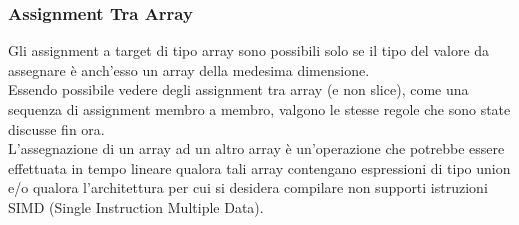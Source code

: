 \subsubsection{Assignment Tra Array}
Gli assignment a target di tipo array sono possibili solo se il tipo del valore da assegnare 
è anch'esso un array della medesima dimensione. \\

Essendo possibile vedere degli assignment tra array (e non slice), come una sequenza 
di assignment membro a membro, valgono le stesse regole che sono state discusse fin ora. \\

L'assegnazione di un array ad un altro array è un'operazione che potrebbe essere effettuata in 
tempo lineare qualora tali array contengano espressioni di tipo union e/o qualora l'architettura per 
cui si desidera compilare non supporti istruzioni SIMD (Single Instruction Multiple Data).